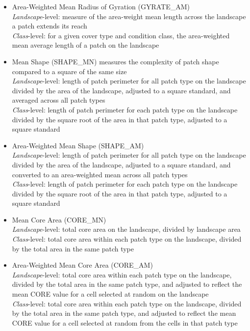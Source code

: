 \begin{itemize}
\begin{itemize}
		\item Area-Weighted Mean Radius of Gyration (GYRATE\_AM)\\
		\emph{Landscape}-level: measure of the area-weight mean length across the landscape a patch extends its reach\\
		\emph{Class}-level: for a given cover type and condition class, the area-weighted mean average length of a patch on the landscape\\
		
		\item Mean Shape (SHAPE\_MN) measures the complexity of patch shape compared to a square of the same size\\
		\emph{Landscape}-level: length of patch perimeter for all patch type on the landscape divided by the area of the landscape, adjusted to a square standard, and averaged across all patch types\\
		\emph{Class}-level: length of patch perimeter for each patch type on the landscape divided by the square root of the area in that patch type, adjusted to a square standard \\
		
		\item Area-Weighted Mean Shape (SHAPE\_AM)\\
		\emph{Landscape}-level: length of patch perimeter for all patch type on the landscape divided by the area of the landscape, adjusted to a square standard, and converted to an area-weighted mean across all patch types \\
		\emph{Class}-level: length of patch perimeter for each patch type on the landscape divided by the square root of the area in that patch type, adjusted to a square standard\\
		
		\item Mean Core Area (CORE\_MN)\\
		\emph{Landscape}-level: total core area on the landscape, divided by landscape area\\
		\emph{Class}-level: total core area within each patch type on the landscape, divided by the total area in the same patch type\\
		
		\item Area-Weighted Mean Core Area (CORE\_AM)\\
		\emph{Landscape}-level: total core area within each patch type on the landscape, divided by the total area in the same patch type, and adjusted to reflect the mean CORE value for a cell selected at random on the landscape	\\
		\emph{Class}-level: total core area within each patch type on the landscape, divided by the total area in the same patch type, and adjusted to reflect the mean CORE value for a cell selected at random from the cells in that patch type	\\
		

\end{itemize}
\end{itemize}
